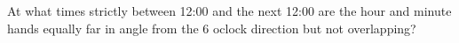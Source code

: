 At what times strictly between 12:00 and the next 12:00 are the hour and minute hands equally far in angle from the 6 o\textquotesingle clock direction but not overlapping?
